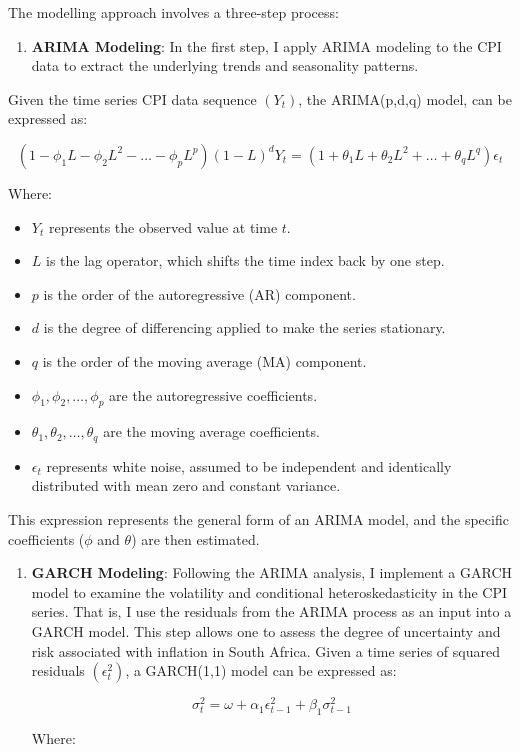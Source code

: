 \documentclass[11pt,preprint, authoryear]{elsarticle}
\numberwithin{equation}{section}
\numberwithin{figure}{section}
\numberwithin{table}{section}
\def\tightlist{} %
\begin{document}
The modelling approach involves a three-step process:

\begin{enumerate}
\def\labelenumi{\arabic{enumi}.}
\tightlist
\item
  \textbf{ARIMA Modeling}: In the first step, I apply ARIMA modeling to
  the CPI data to extract the underlying trends and seasonality
  patterns.
\end{enumerate}

Given the time series CPI data sequence \((Y_t)\), the ARIMA(p,d,q)
model, can be expressed as:

\[
(1 - \phi_1 L - \phi_2 L^2 - \ldots - \phi_p L^p)(1 - L)^d Y_t = (1 + \theta_1 L + \theta_2 L^2 + \ldots + \theta_q L^q) \epsilon_t 
\]

Where:

\begin{itemize}
\tightlist
\item
  \(Y_t\) represents the observed value at time \(t\).
\item
  \(L\) is the lag operator, which shifts the time index back by one
  step.
\item
  \(p\) is the order of the autoregressive (AR) component.
\item
  \(d\) is the degree of differencing applied to make the series
  stationary.
\item
  \(q\) is the order of the moving average (MA) component.
\item
  \(\phi_1, \phi_2, \ldots, \phi_p\) are the autoregressive
  coefficients.
\item
  \(\theta_1, \theta_2, \ldots, \theta_q\) are the moving average
  coefficients.
\item
  \(\epsilon_t\) represents white noise, assumed to be independent and
  identically distributed with mean zero and constant variance.
\end{itemize}

This expression represents the general form of an ARIMA model, and the
specific coefficients (\(\phi\) and \(\theta\)) are then estimated.

\begin{enumerate}
\def\labelenumi{\arabic{enumi}.}
\setcounter{enumi}{1}
\item
  \textbf{GARCH Modeling}: Following the ARIMA analysis, I implement a
  GARCH model to examine the volatility and conditional
  heteroskedasticity in the CPI series. That is, I use the residuals
  from the ARIMA process as an input into a GARCH model. This step
  allows one to assess the degree of uncertainty and risk associated
  with inflation in South Africa. Given a time series of squared
  residuals \((\epsilon_t^2)\), a GARCH(1,1) model can be expressed as:

  \[
  \sigma_t^2 = \omega + \alpha_1 \epsilon_{t-1}^2 + \beta_1 \sigma_{t-1}^2
  \]

  Where:
\end{enumerate}
\end{document}
